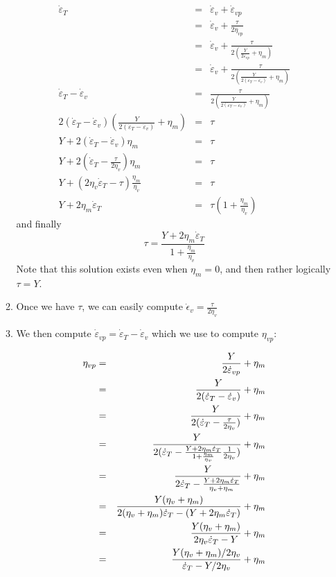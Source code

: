 \begin{itemize}
\begin{enumerate}
\begin{eqnarray}
\dot\varepsilon_T 
&=& \dot\varepsilon_v + \dot\varepsilon_{vp}  \nonumber\\
&=& \dot\varepsilon_v + \frac{\tau}{2 \eta_{vp}} \nonumber\\
&=& \dot\varepsilon_v + \frac{\tau}{2 \left( \frac{Y}{2\dot\varepsilon_{vp}} + \eta_m  \right)} \nonumber\\
&=& \dot\varepsilon_v + \frac{\tau}{2 \left( \frac{Y}{2(\dot\varepsilon_T-\dot\varepsilon_v)}+\eta_m\right)} \nonumber\\
\dot\varepsilon_T - \dot\varepsilon_v 
&=& \frac{\tau}{2 \left( \frac{Y}{2(\dot\varepsilon_T-\dot\varepsilon_v)}+\eta_m\right)} \nonumber\\
2 (\dot\varepsilon_T - \dot\varepsilon_v)
\left( \frac{Y}{2(\dot\varepsilon_T-\dot\varepsilon_v)}+\eta_m\right) &=& \tau \nonumber\\
Y +  2(\dot\varepsilon_T - \dot\varepsilon_v) \eta_m &=& \tau \nonumber\\
Y +  2(\dot\varepsilon_T - \frac{\tau}{2 \eta_v}) \eta_m &=& \tau \nonumber\\
Y +  (2\eta_v \dot\varepsilon_T - \tau) \frac{\eta_m}{\eta_v} &=& \tau \nonumber\\
Y +  2\eta_m \dot\varepsilon_T  &=& \tau (1 + \frac{\eta_m}{\eta_v} ) \nonumber
\end{eqnarray}
and finally 
\begin{equation}
\tau  = \frac{Y + 2 \eta_m \dot\varepsilon_T} {1+ \frac{\eta_m}{\eta_v} }
\end{equation}
Note that this solution exists even when $\eta_m=0$, and then rather logically $\tau=Y$.

\item Once we have $\tau$, we can easily compute $\dot\epsilon_v = \frac{\tau}{2\eta_v}$

\item We then compute $\dot\varepsilon_{vp} = \dot\varepsilon_T- \dot\varepsilon_v$ which 
we use to compute $\eta_{vp}$:

\begin{eqnarray}
\eta_{vp} 
&=& \frac{Y}{2\dot\varepsilon_{vp}}+\eta_m \nonumber\\
&=& \frac{Y}{2(\dot\varepsilon_{T}-\dot\varepsilon_{v})}+\eta_m \nonumber\\
&=& \frac{Y}{2(\dot\varepsilon_{T}-\frac{\tau}{2\eta_v})}+\eta_m \nonumber\\
&=& \frac{Y}{2(\dot\varepsilon_{T}- \frac{Y + 2 \eta_m \dot\varepsilon_T} {1+ \frac{\eta_m}{\eta_v} }   
\frac{1}{2\eta_v})}+\eta_m \nonumber\\
&=& \frac{Y}{2\dot\varepsilon_{T}- \frac{Y + 2 \eta_m \dot\varepsilon_T} {\eta_v + \eta_m}     }+\eta_m \\
&=& \frac{Y(\eta_v+\eta_m)}{2(\eta_v+\eta_m) \dot\varepsilon_{T}- (Y + 2 \eta_m \dot\varepsilon_T) }+\eta_m \\
&=& \frac{Y(\eta_v+\eta_m)}{2 \eta_v \dot\varepsilon_{T}- Y  }+\eta_m \\
&=& \frac{Y(\eta_v+\eta_m)/2\eta_v}{ \dot\varepsilon_{T}- Y/2\eta_v  }+\eta_m 
\end{eqnarray}



\end{enumerate}
\end{itemize}
